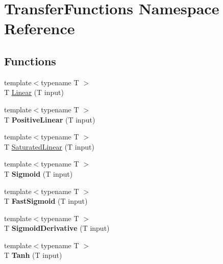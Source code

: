 \hypertarget{namespace_transfer_functions}{\section{Transfer\-Functions Namespace Reference}
\label{namespace_transfer_functions}
}
\subsection*{Functions}
\begin{DoxyCompactItemize}
\item 
{\footnotesize template$<$typename T $>$ }\\T \hyperlink{namespace_transfer_functions_a0d83aec6536e9695890ebe13fc6126d0}{Linear} (T input)
\item 
\hypertarget{namespace_transfer_functions_a979551c123dc84b2bb2907fca94ea945}{{\footnotesize template$<$typename T $>$ }\\T {\bfseries Positive\-Linear} (T input)}\label{namespace_transfer_functions_a979551c123dc84b2bb2907fca94ea945}

\item 
{\footnotesize template$<$typename T $>$ }\\T \hyperlink{namespace_transfer_functions_aa9cca800e59bdd837189466b39669191}{Saturated\-Linear} (T input)
\item 
\hypertarget{namespace_transfer_functions_a9df6db0ada4f365903d3a75aeebab3a6}{{\footnotesize template$<$typename T $>$ }\\T {\bfseries Sigmoid} (T input)}\label{namespace_transfer_functions_a9df6db0ada4f365903d3a75aeebab3a6}

\item 
\hypertarget{namespace_transfer_functions_a4c4f8655694155260ee1a3f29399ed5c}{{\footnotesize template$<$typename T $>$ }\\T {\bfseries Fast\-Sigmoid} (T input)}\label{namespace_transfer_functions_a4c4f8655694155260ee1a3f29399ed5c}

\item 
\hypertarget{namespace_transfer_functions_ae35cac80814f86dca80c98745f038a40}{{\footnotesize template$<$typename T $>$ }\\T {\bfseries Sigmoid\-Derivative} (T input)}\label{namespace_transfer_functions_ae35cac80814f86dca80c98745f038a40}

\item 
\hypertarget{namespace_transfer_functions_a0ec3800c9549439c0ed45e9b0a0bff88}{{\footnotesize template$<$typename T $>$ }\\T {\bfseries Tanh} (T input)}\label{namespace_transfer_functions_a0ec3800c9549439c0ed45e9b0a0bff88}


\end{DoxyCompactItemize}
